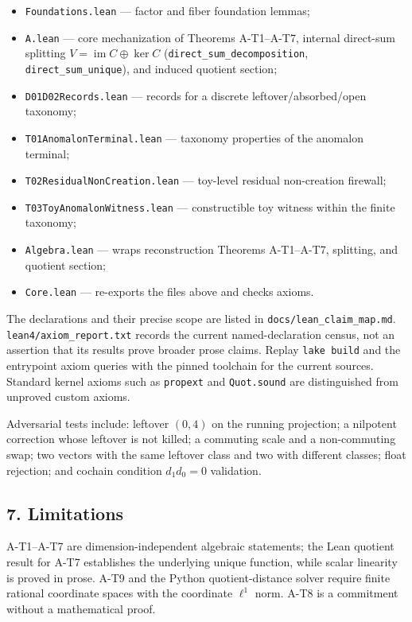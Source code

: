 \documentclass[
  11pt,
]{article}
\providecommand{\tightlist}{%
  \setlength{\itemsep}{0pt}\setlength{\parskip}{0pt}}
\begin{document}
\begin{itemize}
\tightlist
\item
  \nolinkurl{Foundations.lean} --- factor and fiber foundation lemmas;
\item
  \nolinkurl{A.lean} --- core mechanization of Theorems A-T1--A-T7, internal direct-sum splitting \(V = \operatorname{im} C \oplus \ker C\) (\nolinkurl{direct_sum_decomposition}, \texttt{direct\_sum\_unique}), and induced quotient section;
\item
  \nolinkurl{D01D02Records.lean} --- records for a discrete leftover/absorbed/open taxonomy;
\item
  \nolinkurl{T01AnomalonTerminal.lean} --- taxonomy properties of the anomalon terminal;
\item
  \nolinkurl{T02ResidualNonCreation.lean} --- toy-level residual non-creation firewall;
\item
  \nolinkurl{T03ToyAnomalonWitness.lean} --- constructible toy witness within the finite taxonomy;
\item
  \nolinkurl{Algebra.lean} --- wraps reconstruction Theorems A-T1--A-T7, splitting, and quotient section;
\item
  \texttt{Core.lean} --- re-exports the files above and checks axioms.
\end{itemize}

The declarations and their precise scope are listed in \nolinkurl{docs/lean_claim_map.md}. \nolinkurl{lean4/axiom_report.txt} records the current named-declaration census, not an assertion that its results prove broader prose claims. Replay \texttt{lake\ build} and the entrypoint axiom queries with the pinned toolchain for the current sources. Standard kernel axioms such as \texttt{propext} and \texttt{Quot.sound} are distinguished from unproved custom axioms.

Adversarial tests include: leftover \((0,4)\) on the running projection; a nilpotent correction whose leftover is not killed; a commuting scale and a non-commuting swap; two vectors with the same leftover class and two with different classes; float rejection; and cochain condition \(d_1 d_0 = 0\) validation.

\subsection{7. Limitations}\label{limitations}

A-T1--A-T7 are dimension-independent algebraic statements; the Lean quotient result for A-T7 establishes the underlying unique function, while scalar linearity is proved in prose. A-T9 and the Python quotient-distance solver require finite rational coordinate spaces with the coordinate \(\ell^1\) norm. A-T8 is a commitment without a mathematical proof.
\end{document}
